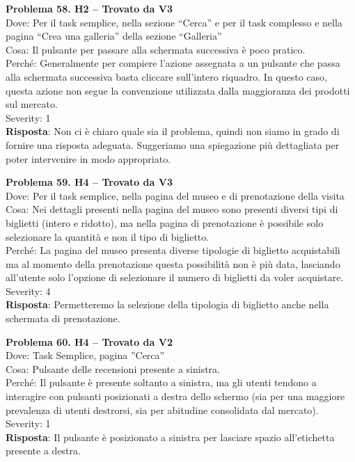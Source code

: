 \documentclass{article}
\begin{document}
\noindent \textbf{Problema 58. H2 – Trovato da V3} \\
Dove: Per il task semplice, nella sezione “Cerca” e per il task complesso e nella pagina “Crea una galleria” della sezione “Galleria” \\
Cosa: Il pulsante per passare alla schermata successiva è poco pratico. \\
Perché: Generalmente per compiere l’azione assegnata a un pulsante che passa alla schermata successiva basta cliccare sull’intero riquadro. In questo caso, questa azione non segue la convenzione utilizzata dalla maggioranza dei prodotti sul mercato. \\
Severity: 1 \\
\textbf{Risposta}: Non ci è chiaro quale sia il problema, quindi non siamo in grado di fornire una risposta adeguata. Suggeriamo una spiegazione più dettagliata per poter intervenire in modo appropriato.

\noindent \textbf{Problema 59. H4 – Trovato da V3} \\
Dove: Per il task semplice, nella pagina del museo e di prenotazione della visita \\
Cosa: Nei dettagli presenti nella pagina del museo sono presenti diversi tipi di biglietti (intero e ridotto), ma nella pagina di prenotazione è possibile solo selezionare la quantità e non il tipo di biglietto. \\
Perché: La pagina del museo presenta diverse tipologie di biglietto acquistabili ma al momento della prenotazione questa possibilità non è più data, lasciando all’utente solo l’opzione di selezionare il numero di biglietti da voler acquistare. \\
Severity: 4 \\
\textbf{Risposta}: Permetteremo la selezione della tipologia di biglietto anche nella schermata di prenotazione.

\noindent \textbf{Problema 60. H4 – Trovato da V2} \\
Dove: Task Semplice, pagina ”Cerca” \\
Cosa: Pulsante delle recensioni presente a sinistra. \\
Perché: Il pulsante è presente soltanto a sinistra, ma gli utenti tendono a interagire con pulsanti posizionati a destra dello schermo (sia per una maggiore prevalenza di utenti destrorsi, sia per abitudine consolidata dal mercato). \\
Severity: 1 \\
\textbf{Risposta}: Il pulsante è posizionato a sinistra per lasciare spazio all’etichetta presente a destra.
\end{document}
